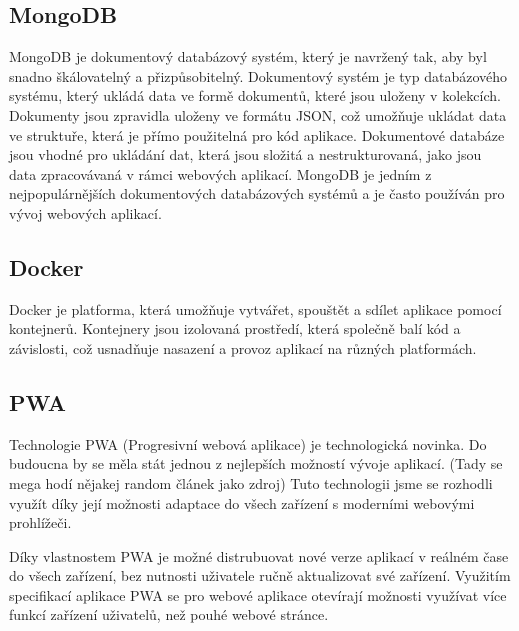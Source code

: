 \subsection{MongoDB}\label{mongo}
MongoDB je dokumentový databázový systém, který je navržený tak, aby byl snadno škálovatelný a přizpůsobitelný. Dokumentový systém je typ databázového systému, který ukládá data ve formě dokumentů, které jsou uloženy v kolekcích. Dokumenty jsou zpravidla uloženy ve formátu JSON, což umožňuje ukládat data ve struktuře, která je přímo použitelná pro kód aplikace. Dokumentové databáze jsou vhodné pro ukládání dat, která jsou složitá a nestrukturovaná, jako jsou data zpracovávaná v rámci webových aplikací. MongoDB je jedním z nejpopulárnějších dokumentových databázových systémů a je často používán pro vývoj webových aplikací.

\subsection{Docker}
Docker je platforma, která umožňuje vytvářet, spouštět a sdílet aplikace pomocí kontejnerů. Kontejnery jsou izolovaná prostředí, která společně balí kód a závislosti, což usnadňuje nasazení a provoz aplikací na různých platformách.

\subsection{PWA}
Technologie PWA (Progresivní webová aplikace) je technologická novinka. Do budoucna by se měla stát jednou z nejlepších možností vývoje aplikací. (Tady se mega hodí nějakej random článek jako zdroj)
Tuto technologii jsme se rozhodli využít díky její možnosti adaptace do všech zařízení s moderními webovými prohlížeči.

Díky vlastnostem PWA je možné distrubuovat nové verze aplikací v reálném čase do všech zařízení, bez nutnosti uživatele ručně aktualizovat své zařízení.
Využitím specifikací aplikace PWA se pro webové aplikace otevírají možnosti využívat více funkcí zařízení uživatelů, než pouhé webové stránce.